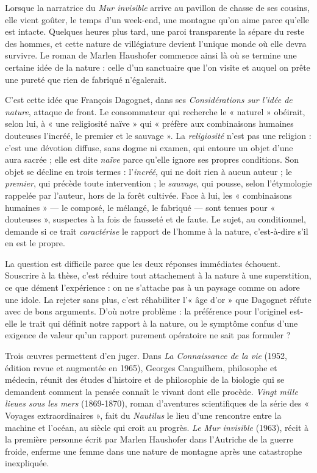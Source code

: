 \documentclass[11pt,a4paper]{article}
\begin{document}
Lorsque la narratrice du \emph{Mur invisible} arrive au pavillon de chasse de ses cousins, elle vient goûter, le temps d'un week-end, une montagne qu'on aime parce qu'elle est intacte. Quelques heures plus tard, une paroi transparente la sépare du reste des hommes, et cette nature de villégiature devient l'unique monde où elle devra survivre. Le roman de Marlen Haushofer commence ainsi là où se termine une certaine idée de la nature : celle d'un sanctuaire que l'on visite et auquel on prête une pureté que rien de fabriqué n'égalerait.

C'est cette idée que François Dagognet, dans ses \emph{Considérations sur l'idée de nature}, attaque de front. Le consommateur qui recherche le « naturel » obéirait, selon lui, à « une religiosité naïve » qui « préfère aux combinaisons humaines douteuses l'incréé, le premier et le sauvage ». La \emph{religiosité} n'est pas une religion : c'est une dévotion diffuse, sans dogme ni examen, qui entoure un objet d'une aura sacrée ; elle est dite \emph{naïve} parce qu'elle ignore ses propres conditions. Son objet se décline en trois termes : l'\emph{incréé}, qui ne doit rien à aucun auteur ; le \emph{premier}, qui précède toute intervention ; le \emph{sauvage}, qui pousse, selon l'étymologie rappelée par l'auteur, hors de la forêt cultivée. Face à lui, les « combinaisons humaines » --- le composé, le mélangé, le fabriqué --- sont tenues pour « douteuses », suspectes à la fois de fausseté et de faute. Le sujet, au conditionnel, demande si ce trait \emph{caractérise} le rapport de l'homme à la nature, c'est-à-dire s'il en est le propre.

La question est difficile parce que les deux réponses immédiates échouent. Souscrire à la thèse, c'est réduire tout attachement à la nature à une superstition, ce que dément l'expérience : on ne s'attache pas à un paysage comme on adore une idole. La rejeter sans plus, c'est réhabiliter l'« âge d'or » que Dagognet réfute avec de bons arguments. D'où notre problème : la préférence pour l'originel est-elle le trait qui définit notre rapport à la nature, ou le symptôme confus d'une exigence de valeur qu'un rapport purement opératoire ne sait pas formuler ?

Trois œuvres permettent d'en juger. Dans \emph{La Connaissance de la vie} (1952, édition revue et augmentée en 1965), Georges Canguilhem, philosophe et médecin, réunit des études d'histoire et de philosophie de la biologie qui se demandent comment la pensée connaît le vivant dont elle procède. \emph{Vingt mille lieues sous les mers} (1869-1870), roman d'aventures scientifiques de la série des « Voyages extraordinaires », fait du \emph{Nautilus} le lieu d'une rencontre entre la machine et l'océan, au siècle qui croit au progrès. \emph{Le Mur invisible} (1963), récit à la première personne écrit par Marlen Haushofer dans l'Autriche de la guerre froide, enferme une femme dans une nature de montagne après une catastrophe inexpliquée.
\end{document}
